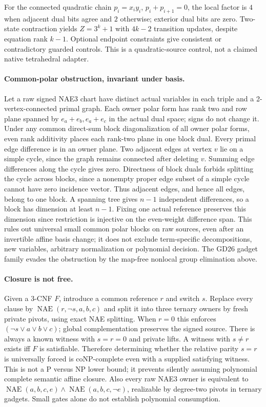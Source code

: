 \documentclass[11pt]{article}
\begin{document}
For the connected quadratic chain $p_i=x_i y_i$, $p_i+p_{i+1}=0$, the local factor is $4$ when adjacent dual bits agree and $2$ otherwise; exterior dual bits are zero. Two-state contraction yields $Z=3^k+1$ with $4k-2$ transition updates, despite equation rank $k-1$. Optional endpoint constraints give consistent or contradictory guarded controls. This is a quadratic-source control, not a claimed native tetrahedral adapter.

\paragraph{Common-polar obstruction, invariant under basis.}
Let a raw signed NAE3 chart have distinct actual variables in each triple and a 2-vertex-connected primal graph. Each owner polar form has rank two and row plane spanned by $e_a+e_b,e_a+e_c$ in the actual dual space; signs do not change it. Under any common direct-sum block diagonalization of all owner polar forms, even rank additivity places each rank-two plane in one block dual. Every primal edge difference is in an owner plane. Two adjacent edges at vertex $v$ lie on a simple cycle, since the graph remains connected after deleting $v$. Summing edge differences along the cycle gives zero. Directness of block duals forbids splitting the cycle across blocks, since a nonempty proper edge subset of a simple cycle cannot have zero incidence vector. Thus adjacent edges, and hence all edges, belong to one block. A spanning tree gives $n-1$ independent differences, so a block has dimension at least $n-1$. Fixing one actual reference preserves this dimension since restriction is injective on the even-weight difference span. This rules out universal small common polar blocks on raw sources, even after an invertible affine basis change; it does not exclude term-specific decompositions, new variables, arbitrary normalization or polynomial decision. The GD26 gadget family evades the obstruction by the map-free nonlocal group elimination above.

\paragraph{Closure is not free.}
Given a 3-CNF $F$, introduce a common reference $r$ and switch $s$. Replace every clause by $\operatorname{NAE}(r,\neg s,a,b,c)$ and split it into three ternary owners by fresh private pivots, using exact NAE splitting. When $r=0$ this enforces $(\neg s\lor a\lor b\lor c)$; global complementation preserves the signed source. There is always a known witness with $s=r=0$ and private lifts. A witness with $s\ne r$ exists iff $F$ is satisfiable. Therefore determining whether the relative parity $s=r$ is universally forced is coNP-complete even with a supplied satisfying witness. This is not a P versus NP lower bound; it prevents silently assuming polynomial complete semantic affine closure. Also every raw NAE3 owner is equivalent to $\operatorname{NAE}(a,b,c,e)\land\operatorname{NAE}(a,b,c,\neg e)$, realizable by degree-two pivots in ternary gadgets. Small gates alone do not establish polynomial consumption.
\end{document}
